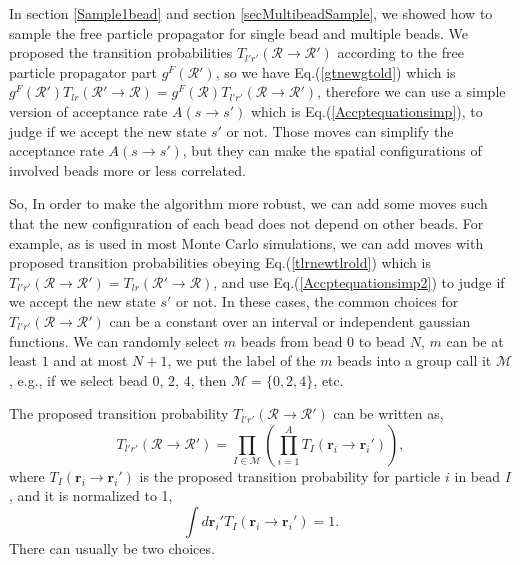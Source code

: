\documentclass[12pt,letterpaper,UTF8]{report}
\begin{document}
In section \ref{Sample1bead} and section \ref{secMultibeadSample}, we showed how to sample the free particle propagator for single bead and multiple beads. We proposed the transition probabilities $T_{l'r'}(\mathcal{R} \rightarrow \mathcal{R}') $ according to the free particle propagator part $g^F(\mathcal{R}')$, so we have Eq.(\ref{gtnewgtold}) which is $g^F(\mathcal{R}') T_{lr}(\mathcal{R}' \rightarrow \mathcal{R}) = g^F(\mathcal{R}) T_{l'r'}(\mathcal{R} \rightarrow \mathcal{R}')  $, therefore we can use a simple version of acceptance rate $A(s\rightarrow s')$ which is Eq.(\ref{Accptequationsimp}), to judge if we accept the new state $s'$ or not.
Those moves can simplify the acceptance rate $A(s\rightarrow s')$, but they can make the spatial configurations of involved beads more or less correlated.

So, In order to make the algorithm more robust,
we can add some moves such that the new configuration of each bead does not depend on other beads.
For example, as is used in most Monte Carlo simulations, we can add moves with proposed transition probabilities obeying Eq.(\ref{tlrnewtlrold}) which is $T_{l'r'}(\mathcal{R} \rightarrow \mathcal{R}') = T_{lr}(\mathcal{R}' \rightarrow \mathcal{R}) $, and use Eq.(\ref{Accptequationsimp2}) to judge if we accept the new state $s'$ or not.
In these cases, the common choices for $T_{l'r'}(\mathcal{R} \rightarrow \mathcal{R}')$ can be a constant over an interval or independent gaussian functions. We can randomly select $m$ beads from bead $0$ to bead $N$, $m$ can be at least $1$ and at most $N+1$, we put the label of the $m$ beads into a group call it $\mathcal{M}$, e.g., if we select bead $0$, $2$, $4$, then $\mathcal{M}=\{ 0,2,4 \}$, etc.

The proposed transition probability $T_{l'r'}(\mathcal{R} \rightarrow \mathcal{R}')$ can be written as,
\begin{equation}
T_{l'r'}(\mathcal{R} \rightarrow \mathcal{R}') = \prod_{I  \in \mathcal{M} } \left( \prod_{i=1}^A  T_{I}(\bm{r}_i \rightarrow \bm{r}_i') \right) ,
 \label{}
\end{equation}
where $T_{I}(\bm{r}_i \rightarrow \bm{r}_i') $ is the proposed transition probability for particle $i$ in bead $I$, and it is normalized to 1,
\begin{equation}
\int d \bm{r}_i'  T_{I}(\bm{r}_i \rightarrow \bm{r}_i') =1 .
 \label{}
\end{equation}
There can usually be two choices.
\end{document}
